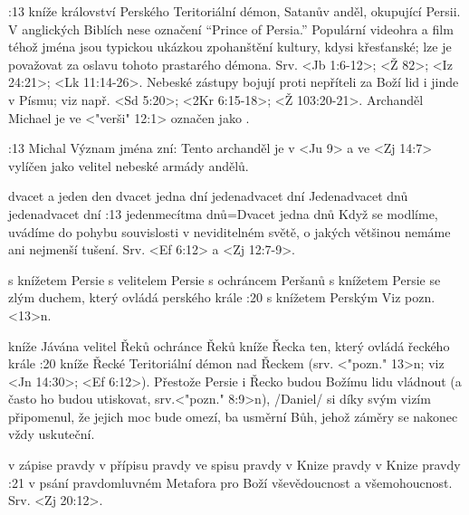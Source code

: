 :13 {kníže království Perského} Teritoriální démon, Satanův anděl, okupující Persii. V anglických Biblích nese označení ``Prince of Persia.'' Populární videohra a film téhož jména jsou typickou ukázkou zpohanštění kultury, kdysi křesťanské; lze je považovat za oslavu tohoto prastarého démona.
Srv. <Jb 1:6-12>; <Ž 82>; <Iz 24:21>; <Lk 11:14-26>. Nebeské zástupy bojují proti nepříteli za Boží lid  i jinde v Písmu; viz např. <Sd 5:20>;  <2Kr 6:15-18>;  <Ž 103:20-21>. Archanděl Michael je ve  <"verši" 12:1> označen jako  .


:13 {Michal} Význam jména zní:  Tento archanděl je v <Ju 9> a ve <Zj 14:7>   vylíčen jako velitel nebeské armády andělů. 

    {dvacet a jeden den} %
    {dvacet jedna dní}   %
    {jedenadvacet dní}   %
    {Jedenadvacet dnů}   %
    {jedenadvacet dní}   %
:13 {jedenmecítma dnů}={Dvacet jedna dnů} Když se modlíme, uvádíme do pohybu souvislosti v neviditelném světě, o jakých většinou nemáme ani nejmenší tušení. Srv. <Ef 6:12> a <Zj 12:7-9>.

    {s knížetem Persie}   %
    {s velitelem Persie}   %
    {s ochráncem Peršanů}   %
    {s knížetem Persie}   %
    {se zlým duchem, který ovládá perského krále}   %
:20 {s knížetem Perským} Viz pozn. <13>n.

    {kníže Jávána}   %
    {velitel Řeků}   %
    {ochránce Řeků}   %
    {kníže Řecka}   %
    {ten, který ovládá řeckého krále}   %
:20 {kníže Řecké} Teritoriální démon nad Řeckem (srv. <"pozn." 13>n; viz <Jn 14:30>; <Ef 6:12>). Přestože Persie i Řecko budou Božímu lidu vládnout (a často ho budou utiskovat, srv.<"pozn." 8:9>n),  \x/Daniel/ si díky svým vizím připomenul, že jejich moc bude omezí, ba usměrní Bůh, jehož záměry se nakonec vždy uskuteční.

    {v zápise pravdy}   %
    {v přípisu pravdy}   %
    {ve spisu pravdy}   %
    {v Knize pravdy}   %
    {v Knize pravdy}   %
:21 {v psání pravdomluvném}
Metafora pro Boží vševědoucnost a všemohoucnost. Srv. <Zj 20:12>.


